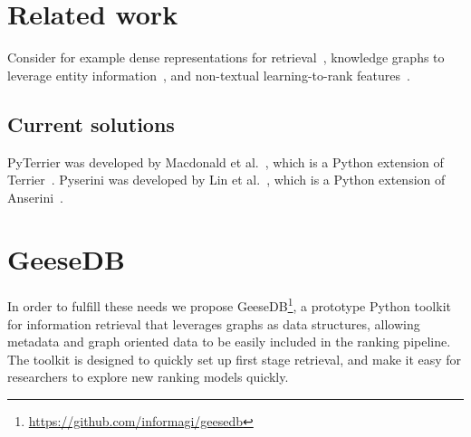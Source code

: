 
\section{Related work }

Consider for example dense representations for retrieval~\cite{dense-retrieval-1, dense-retrieval-2, dense-retrieval-3}, knowledge graphs to leverage entity information~\cite{entity-1, entity-2, entity-3}, and non-textual learning-to-rank features~\cite{ltr-1, ltr-2}.

\subsection{Current solutions}
PyTerrier was developed by Macdonald et al.~\cite{pyterrier}, which is a Python extension of Terrier~\cite{terrier}. 
Pyserini was developed by Lin et al.~\cite{pyserini}, which is a Python extension of Anserini~\cite{anserini}.

\section{GeeseDB}
In order to fulfill these needs we propose GeeseDB\footnote{\url{https://github.com/informagi/geesedb}}, a prototype Python toolkit for information retrieval that leverages graphs as data structures, allowing metadata and graph oriented data to be easily included in the ranking pipeline. The toolkit is designed to quickly set up first stage retrieval, and make it easy for researchers to explore new ranking models quickly. 

